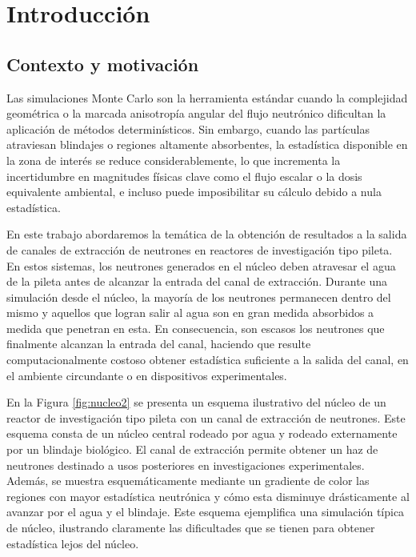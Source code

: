 \chapter{Introducción}

\section{Contexto y motivación}

Las simulaciones Monte Carlo son la herramienta estándar cuando la complejidad geométrica o la marcada anisotropía angular del flujo neutrónico dificultan la aplicación de métodos determinísticos. Sin embargo, cuando las partículas atraviesan blindajes o regiones altamente absorbentes, la estadística disponible en la zona de interés se reduce considerablemente, lo que incrementa la incertidumbre en magnitudes físicas clave como el flujo escalar o la dosis equivalente ambiental, e incluso puede imposibilitar su cálculo debido a nula estadística. 

En este trabajo abordaremos la temática de la obtención de resultados a la salida de canales de extracción de neutrones en reactores de investigación tipo pileta. En estos sistemas, los neutrones generados en el núcleo deben atravesar el agua de la pileta antes de alcanzar la entrada del canal de extracción. Durante una simulación desde el núcleo, la mayoría de los neutrones permanecen dentro del mismo y aquellos que logran salir al agua son en gran medida absorbidos a medida que penetran en esta. En consecuencia, son escasos los neutrones que finalmente alcanzan la entrada del canal, haciendo que resulte computacionalmente costoso obtener estadística suficiente a la salida del canal, en el ambiente circundante o en dispositivos experimentales.

En la Figura \ref{fig:nucleo2} se presenta un esquema ilustrativo del núcleo de un reactor de investigación tipo pileta con un canal de extracción de neutrones. Este esquema consta de un núcleo central rodeado por agua y rodeado externamente por un blindaje biológico. El canal de extracción permite obtener un haz de neutrones destinado a usos posteriores en investigaciones experimentales. Además, se muestra esquemáticamente mediante un gradiente de color las regiones con mayor estadística neutrónica y cómo esta disminuye drásticamente al avanzar por el agua y el blindaje. Este esquema ejemplifica una simulación típica de núcleo, ilustrando claramente las dificultades que se tienen para obtener estadística lejos del núcleo.

